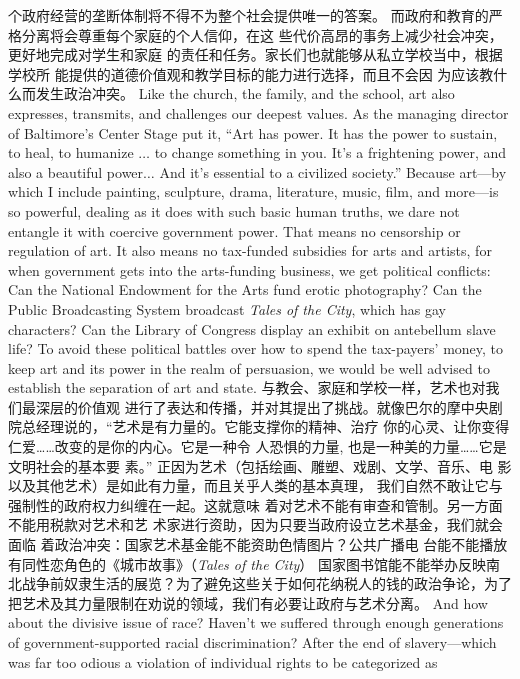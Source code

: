 \begin{paracol}{2}
个政府经营的垄断体制将不得不为整个社会提供唯一的答案。
而政府和教育的严格分离将会尊重每个家庭的个人信仰，在这
些代价高昂的事务上减少社会冲突，更好地完成对学生和家庭
的责任和任务。家长们也就能够从私立学校当中，根据学校所
能提供的道德价值观和教学目标的能力进行选择，而且不会因
为应该教什么而发生政治冲突。
\switchcolumn*
Like the church, the family, and the school, art also expresses,
transmits, and challenges our deepest values. As the managing
director of Baltimore's Center Stage put it, ``Art has power. It
has the power to sustain, to heal, to humanize $\ldots$ to change
something in you. It's a frightening power, and also a beautiful
power$\ldots$ And it's essential to a civilized society.'' Because
art---by which I include painting, sculpture, drama, literature,
music, film, and more---is so powerful, dealing as it does with
such basic human truths, we dare not entangle it with coercive
government power. That means no censorship or regulation of
art. It also means no tax-funded subsidies for arts and artists,
for when government gets into the arts-funding business, we
get political conflicts: Can the National Endowment for the
Arts fund erotic photography? Can the Public Broadcasting
System broadcast \textit{Tales of the City}, which has gay characters? Can
the Library of Congress display an exhibit on antebellum slave
life? To avoid these political battles over how to spend the tax-payers' money, to keep art and its power in the realm of persuasion, we would be well advised to establish the separation of art
and state.
\switchcolumn
与教会、家庭和学校一样，艺术也对我们最深层的价值观
进行了表达和传播，并对其提出了挑战。就像巴尔的摩中央剧
院总经理说的，“艺术是有力量的。它能支撑你的精神、治疗
你的心灵、让你变得仁爱……改变的是你的内心。它是一种令
人恐惧的力量, 也是一种美的力量……它是文明社会的基本要
素。” 正因为艺术（包括绘画、雕塑、戏剧、文学、音乐、电
影以及其他艺术）是如此有力量，而且关乎人类的基本真理，
我们自然不敢让它与强制性的政府权力纠缠在一起。这就意味
着对艺术不能有审查和管制。另一方面不能用税款对艺术和艺
术家进行资助，因为只要当政府设立艺术基金，我们就会面临
着政治冲突：国家艺术基金能不能资助色情图片？公共广播电
台能不能播放有同性恋角色的《城市故事》（\textit{Tales of the City}） 国家图书馆能不能举办反映南北战争前奴隶生活的展览？为了避免这些关于如何花纳税人的钱的政治争论，为了把艺术及其力量限制在劝说的领域，我们有必要让政府与艺术分离。
\switchcolumn*
And how about the divisive issue of race? Haven't we suffered through enough generations of government-supported
racial discrimination? After the end of slavery---which was far
too odious a violation of individual rights to be categorized as

\end{paracol}
